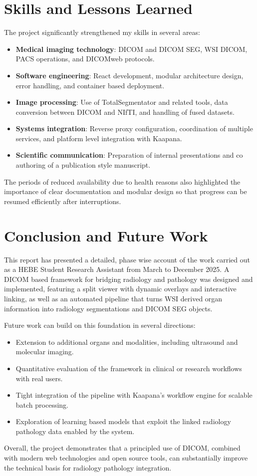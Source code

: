 \documentclass[11pt,a4paper]{article}
\begin{document}
\section{Skills and Lessons Learned}
\label{sec:skills}

The project significantly strengthened my skills in several areas:

\begin{itemize}
    \item \textbf{Medical imaging technology}: DICOM and DICOM SEG, WSI DICOM, PACS operations, and DICOMweb protocols.
    \item \textbf{Software engineering}: React development, modular architecture design, error handling, and container based deployment.
    \item \textbf{Image processing}: Use of TotalSegmentator and related tools, data conversion between DICOM and NIfTI, and handling of fused datasets.
    \item \textbf{Systems integration}: Reverse proxy configuration, coordination of multiple services, and platform level integration with Kaapana.
    \item \textbf{Scientific communication}: Preparation of internal presentations and co authoring of a publication style manuscript.
\end{itemize}

The periods of reduced availability due to health reasons also highlighted the importance of clear documentation and modular design so that progress can be resumed efficiently after interruptions.

\section{Conclusion and Future Work}
\label{sec:conclusion}

This report has presented a detailed, phase wise account of the work carried out as a HEBE Student Research Assistant from March to December 2025. A DICOM based framework for bridging radiology and pathology was designed and implemented, featuring a split viewer with dynamic overlays and interactive linking, as well as an automated pipeline that turns WSI derived organ information into radiology segmentations and DICOM SEG objects.

Future work can build on this foundation in several directions:
\begin{itemize}
    \item Extension to additional organs and modalities, including ultrasound and molecular imaging.
    \item Quantitative evaluation of the framework in clinical or research workflows with real users.
    \item Tight integration of the pipeline with Kaapana's workflow engine for scalable batch processing.
    \item Exploration of learning based models that exploit the linked radiology pathology data enabled by the system.
\end{itemize}

Overall, the project demonstrates that a principled use of DICOM, combined with modern web technologies and open source tools, can substantially improve the technical basis for radiology pathology integration.
\end{document}
